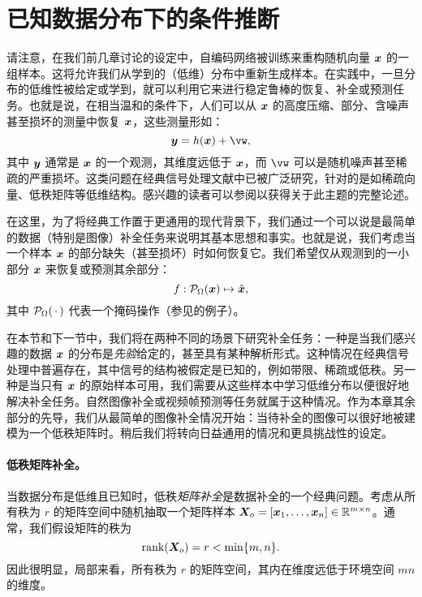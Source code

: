 \documentclass[../../book-main.tex]{subfiles}
\begin{document}


\section{已知数据分布下的条件推断}
请注意，在我们前几章讨论的设定中，自编码网络被训练来重构随机向量 $\bm{x}$ 的一组样本。这将允许我们从学到的（低维）分布中重新生成样本。在实践中，一旦分布的低维性被给定或学到，就可以利用它来进行稳定鲁棒的恢复、补全或预测任务。也就是说，在相当温和的条件下，人们可以从 $\bm{x}$ 的高度压缩、部分、含噪声甚至损坏的测量中恢复 $\bm{x}$，这些测量形如：
\begin{equation}
    \y = h(\x) + \vw,
\end{equation}
其中 $\bm{y}$ 通常是 $\bm{x}$ 的一个观测，其维度远低于 $\bm{x}$，而 $\vw$ 可以是随机噪声甚至稀疏的严重损坏。这类问题在经典信号处理文献中已被广泛研究，针对的是如稀疏向量、低秩矩阵等低维结构。感兴趣的读者可以参阅\cite{Wright-Ma-2022}以获得关于此主题的完整论述。

在这里，为了将经典工作置于更通用的现代背景下，我们通过一个可以说是最简单的数据（特别是图像）补全任务来说明其基本思想和事实。也就是说，我们考虑当一个样本 $\bm{x}$ 的部分缺失（甚至损坏）时如何恢复它。我们希望仅从观测到的一小部分 $\bm{x}$ 来恢复或预测其余部分：
\begin{equation}
f: \mathcal{P}_{\Omega}(\bm{x}) \mapsto \hat{\bm{x}},
\end{equation}
其中 $\mathcal{P}_{\Omega}(\,\cdot\,)$ 代表一个掩码操作（参见的例子）。

在本节和下一节中，我们将在两种不同的场景下研究补全任务：一种是当我们感兴趣的数据 $\bm{x}$ 的分布是{\em 先验}给定的，甚至具有某种解析形式。这种情况在经典信号处理中普遍存在，其中信号的结构被假定是已知的，例如带限、稀疏或低秩。另一种是当只有 $\bm{x}$ 的原始样本可用，我们需要从这些样本中学习低维分布以便很好地解决补全任务。自然图像补全或视频帧预测等任务就属于这种情况。作为本章其余部分的先导，我们从最简单的图像补全情况开始：当待补全的图像可以很好地被建模为一个低秩矩阵时。稍后我们将转向日益通用的情况和更具挑战性的设定。

\paragraph{低秩矩阵补全。}  
当数据分布是低维且已知时，低秩{\em 矩阵补全}是数据补全的一个经典问题。考虑从所有秩为 $r$ 的矩阵空间中随机抽取一个矩阵样本 $\bm{X}_o = [\bm{x}_1, \ldots, \bm{x}_n] \in \mathbb{R}^{m\times n}$。通常，我们假设矩阵的秩为
\begin{equation}
\mbox{rank}(\bm{X}_o) = r < \min\{m, n\}.
\end{equation}
因此很明显，局部来看，所有秩为 $r$ 的矩阵空间，其内在维度远低于环境空间 $mn$ 的维度。
\end{document}
